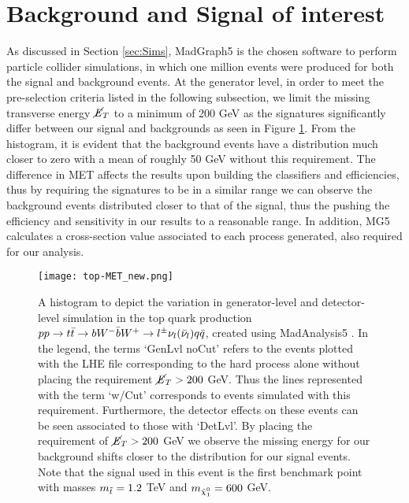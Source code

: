 \section{Background and Signal of interest}
\label{sec:production}
As discussed in Section \ref{sec:Sims}, MadGraph5 is the chosen software to perform particle collider simulations, in which one million events were produced for both the signal and background events. At the generator level, in order to meet the pre-selection criteria listed in the following subsection, we limit the missing transverse energy $\cancel{\it{E}}_{T}$ to a minimum of 200 GeV as the signatures significantly differ between our signal and backgrounds as seen in Figure \ref{fig:topMET}. From the histogram, it is evident that the background events have a distribution much closer to zero with a mean of roughly 50 GeV without this requirement. The difference in MET affects the results upon building the classifiers and efficiencies, thus by requiring the signatures to be in a similar range we can observe the background events distributed closer to that of the signal, thus the pushing the efficiency and sensitivity in our results to a reasonable range. In addition, MG5 calculates a cross-section value associated to each process generated, also required for our analysis. \\

\begin{figure}[htbp]
    \centering
    \texttt{[image: top-MET\_new.png]}
    \caption{A histogram to depict the variation in generator-level and detector-level simulation in the top quark production $pp \rightarrow t\Bar{t} \rightarrow bW^{-}\Bar{b}W^{+} \rightarrow l^{\pm}\nu_l(\Bar{\nu}_l)q\Bar{q}$, created using MadAnalysis5 \cite{conte2013madanalysis, conte2014designing, dumont2015toward}. In the legend, the terms `GenLvl noCut' refers to the events plotted with the LHE file corresponding to the hard process alone without placing the requirement $\cancel{\it{E}}_{T}>200$ GeV. Thus the lines represented with the term `w/Cut' corresponds to events simulated with this requirement. Furthermore, the detector effects on these events can be seen associated to those with `DetLvl'. By placing the requirement of $\cancel{\it{E}}_{T}>200$ GeV we observe the missing energy for our background shifts closer to the distribution for our signal events. Note that the signal used in this event is the first benchmark point with masses $m_{\Tilde{t}} = 1.2$ TeV and $m_{\Tilde{\chi}_1^0} = 600$ GeV.}
    \label{fig:topMET}
\end{figure}

